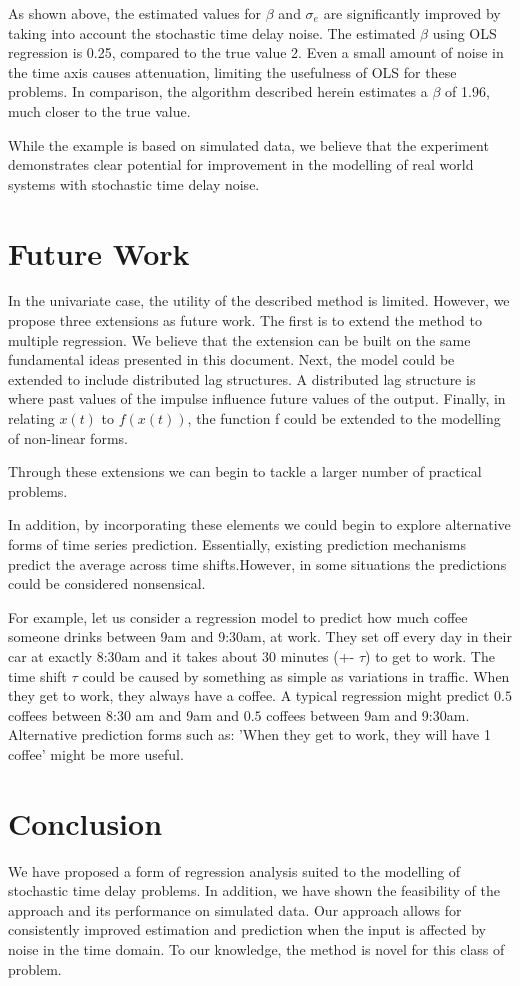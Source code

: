 \documentclass[11pt]{amsart}
\begin{document}
As shown above, the estimated values for $\beta$ and $\sigma_e$ are significantly improved by taking into account the stochastic time delay noise. The estimated $\beta$ using OLS regression is 0.25, compared to the true value 2. Even a small amount of noise in the time axis causes attenuation, 
limiting the usefulness of OLS for these problems.
In comparison, the algorithm described herein estimates a $\beta$ of 1.96, much closer to the true value.

While the example is based on simulated data, we believe that the experiment demonstrates clear potential for improvement in the modelling of real world systems with stochastic time delay noise.


\section{Future Work}

In the univariate case, the utility of the described method is limited. However, we propose three extensions as future work. The first is to extend the method to multiple regression. We believe that the extension can be built on the same fundamental ideas presented in this document. Next, the model could be extended to include distributed lag structures. A distributed lag structure is where past values of the impulse influence future values of the output. Finally, in relating $x(t)$ to $f(x(t))$, the function f could be extended to the modelling of non-linear forms.

Through these extensions we can begin to tackle a larger number of practical problems.

In addition, by incorporating these elements we could begin to explore alternative forms of time series prediction. Essentially, existing prediction mechanisms predict the average across time shifts.However, in some situations the predictions could be considered nonsensical.

For example, let us consider a regression model to predict how much coffee someone drinks between 9am and 9:30am, at work. They set off every day in their car at exactly 8:30am and it takes about 30 minutes (+- $\tau$) to get to work. The time shift $\tau$ could be caused by something as simple as variations in traffic. When they get to work, they always have a coffee. A typical regression might predict $0.5$ coffees between 8:30 am and 9am and $0.5$ coffees between 9am and 9:30am. Alternative prediction forms such as: 'When they get to work, they will have 1 coffee' might be more useful.


\section{Conclusion}

We have proposed a form of regression analysis suited to the modelling of stochastic time delay problems. In addition, we have shown the feasibility of the approach and its performance on simulated data. Our approach allows for consistently improved estimation and prediction when the input is affected by noise in the time domain. To our knowledge, the method is novel for this class of problem.
\end{document}
